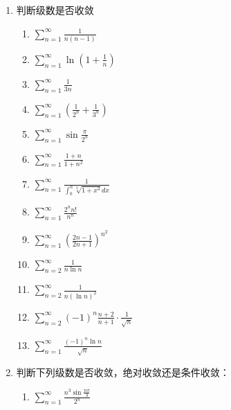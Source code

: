 \begin{enumerate}
	
	\item 判断级数是否收敛
	\begin{enumerate}
		\item $\sum\limits_{n=1}^{\infty} \frac{1}{n(n-1)}$
		
		
		\item $\sum\limits_{n=1}^{\infty} \ln \left(1+\frac{1}{n}\right)$
		
		
		\item $\sum\limits_{n=1}^{\infty} \frac{1}{3n}$
		
		
		\item $\sum\limits_{n=1}^{\infty} \left(\frac{1}{2^n} + \frac{1}{3^n}\right)$
		
		
		\item $\sum\limits_{n=1}^{\infty} \sin \frac{\pi}{2^n}$
		
		
		\item $\sum\limits_{n=1}^{\infty} \frac{1+n}{1+n^2}$
		
		
		\item $\sum\limits_{n=1}^{\infty} \frac{1}{\int_0^n \sqrt[3]{1+x^3} dx}$
		
		\item $\sum\limits_{n=1}^{\infty} \frac{2^n n!}{n^n}$
		
		
		\item $\sum\limits_{n=1}^{\infty} \left(\frac{2n-1}{2n+1}\right)^{n^2}$
		
		
		\item $\sum\limits_{n=2}^{\infty} \frac{1}{n \ln n}$
		
		
		\item $\sum\limits_{n=2}^{\infty} \frac{1}{n(\ln n)^2}$
		
		
		\item $\sum\limits_{n=2}^{\infty} (-1)^n \frac{n+2}{n+1} \cdot \frac{1}{\sqrt{n}}$
		
		
		\item $\sum\limits_{n=1}^{\infty} \frac{(-1)^n \ln n}{\sqrt{n}}$
		
		
	\end{enumerate}
	
	\item 判断下列级数是否收敛，绝对收敛还是条件收敛：
	
	\begin{enumerate}
		\item $\sum\limits_{n=1}^{\infty} \frac{n^3 \sin \frac{n\pi}{3}}{2^n}$


\end{enumerate}
\end{enumerate}
